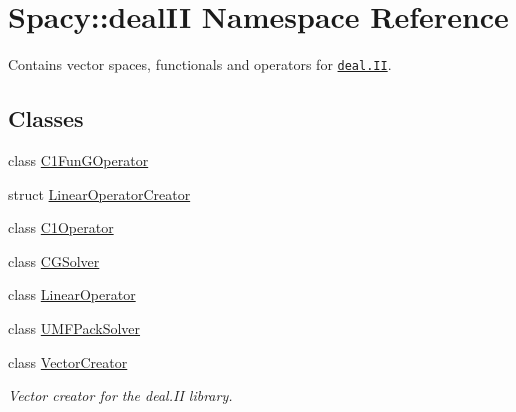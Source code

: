 \hypertarget{namespaceSpacy_1_1dealII}{\section{\-Spacy\-:\-:deal\-I\-I \-Namespace \-Reference}
\label{namespaceSpacy_1_1dealII}
}


\-Contains vector spaces, functionals and operators for \href{www.deal.org}{\tt deal.\-I\-I}.  


\subsection*{\-Classes}
\begin{DoxyCompactItemize}
\item 
class \hyperlink{classSpacy_1_1dealII_1_1C1FunGOperator}{\-C1\-Fun\-G\-Operator}
\item 
struct \hyperlink{structSpacy_1_1dealII_1_1LinearOperatorCreator}{\-Linear\-Operator\-Creator}
\item 
class \hyperlink{classSpacy_1_1dealII_1_1C1Operator}{\-C1\-Operator}
\item 
class \hyperlink{classSpacy_1_1dealII_1_1CGSolver}{\-C\-G\-Solver}
\item 
class \hyperlink{classSpacy_1_1dealII_1_1LinearOperator}{\-Linear\-Operator}
\item 
class \hyperlink{classSpacy_1_1dealII_1_1UMFPackSolver}{\-U\-M\-F\-Pack\-Solver}
\item 
class \hyperlink{classSpacy_1_1dealII_1_1VectorCreator}{\-Vector\-Creator}
\begin{DoxyCompactList}\small\item\em \-Vector creator for the deal.\-I\-I library. \end{DoxyCompactList}\end{DoxyCompactItemize}
